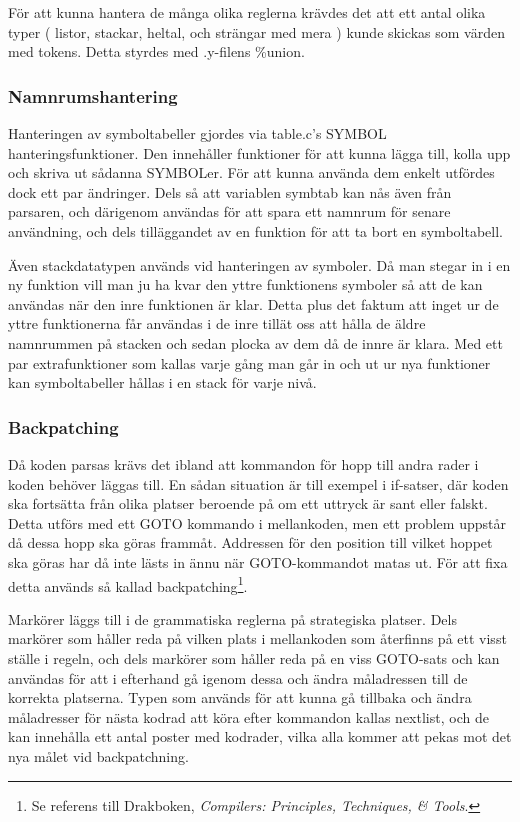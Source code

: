 		För att kunna hantera de många olika reglerna krävdes det att ett antal olika typer ( listor, stackar, heltal, och strängar med mera ) kunde skickas som värden med tokens. Detta styrdes med .y-filens \%union.
	
	\subsubsection{Namnrumshantering}
		Hanteringen av symboltabeller gjordes via table.c's 	SYMBOL hanteringsfunktioner. Den innehåller funktioner för att kunna lägga till, kolla upp och skriva ut sådanna SYMBOLer. För att kunna använda dem enkelt utfördes dock ett par ändringer. Dels så att variablen symbtab kan nås även från parsaren, och därigenom användas för att spara ett namnrum för senare användning, och dels tilläggandet av en funktion för att ta bort en symboltabell.
		
		Även stackdatatypen används vid hanteringen av symboler. Då man stegar in i en ny funktion vill man ju ha kvar den yttre funktionens symboler så att de kan användas när den inre funktionen är klar. Detta plus det faktum att inget ur de yttre funktionerna får användas i de inre tillät oss att hålla de äldre namnrummen på stacken och sedan plocka av dem då de innre är klara. Med ett par extrafunktioner som kallas varje gång man går in och ut ur nya funktioner kan symboltabeller hållas i en stack för varje nivå.
	
	\subsubsection{Backpatching}
		Då koden parsas krävs det ibland att kommandon för hopp till andra rader i koden behöver läggas till. En sådan situation är till exempel i if-satser, där koden ska fortsätta från olika platser beroende på om ett uttryck är sant eller falskt. Detta utförs med ett GOTO kommando i mellankoden, men ett problem uppstår då dessa hopp ska göras frammåt. Addressen för den position till vilket hoppet ska göras har då inte lästs in ännu när GOTO-kommandot matas ut. För att fixa detta används så kallad backpatching\footnote{Se referens till Drakboken, \textit{Compilers: Principles, Techniques, \& Tools}.}.
		
		Markörer läggs till i de grammatiska reglerna på strategiska platser. Dels markörer som håller reda på vilken plats i mellankoden som återfinns på ett visst ställe i regeln, och dels markörer som håller reda på en viss GOTO-sats och kan användas för att i efterhand gå igenom dessa och ändra måladressen till de korrekta platserna. Typen som används för att kunna gå tillbaka och ändra måladresser för nästa kodrad att köra efter kommandon kallas nextlist, och de kan innehålla ett antal poster med kodrader, vilka alla kommer att pekas mot det nya målet vid backpatchning. 
		
